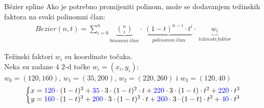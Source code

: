 \documentclass[9pt]{beamer}
\begin{document}
\begin{frame}{B\'{e}zier spline}
	Ako je potrebno promijeniti polinom, može se dodavanjem težinskih faktora na svaki polinomni član:
		\begin{align*}
		Bezier(n,t) = \sum_{i=0}^{n}
		\underset{binomni\ član}{\underbrace{\binom{n}{i}}}
		\cdot\
		\underset{polinomni\ član}{\underbrace{(1-t)^{n-i} \cdot t^{i}}}
		\cdot\
		\underset{težinski faktor}{\underbrace{w_i}}
		\end{align*}
	
	
		Težinski faktori $w_{i}$ su koordinate točaka.\\
		Neka su zadane $4$ $2$-d točke $w_i = (x_i,y_i)$:\\
		$w_0 = (120, 160)$, $w_1 = (35, 200)$, $w_2 = (220, 260)$ i $w_3 = (120, 40)$
		\begin{align*}
		\left \{ \begin{matrix}
		x = {\color{blue}120} \cdot (1-t)^3 + {\color{blue}35} \cdot 3 \cdot (1-t)^2 \cdot t + {\color{blue}220} \cdot 3 \cdot (1-t) \cdot t^2 + {\color{blue}220} \cdot t^3 \\
		y = {\color{blue}160} \cdot (1-t)^3 + {\color{blue}200} \cdot 3 \cdot (1-t)^2 \cdot t + {\color{blue}260} \cdot 3 \cdot (1-t) \cdot t^2 + {\color{blue}40} \cdot t^3
		\end{matrix} \right.
		\end{align*}
\end{frame}
\end{document}
